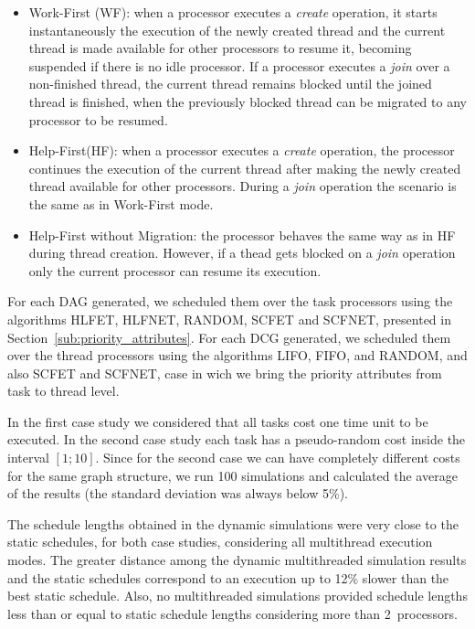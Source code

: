 \documentclass[twocolumn]{svjour3}
\begin{document}
\begin{itemize}
\item Work-First (WF): when a processor executes a \emph{create} operation, it starts instantaneously the execution of the newly created thread and the current thread is made available for other processors to resume it, becoming suspended if there is no idle processor. If a processor executes a \emph{join} over a non-finished thread, the current thread remains blocked until the joined thread is finished, when the previously blocked thread can be migrated to any processor to be resumed.
\item Help-First(HF): when a processor executes a \emph{create} operation, the processor continues the execution of the current thread after making the newly created thread available for other processors. During a \emph{join} operation the scenario is the same as in Work-First mode.
\item Help-First without Migration: the processor behaves the same way as in HF during thread creation. However, if a thead gets blocked on a \emph{join} operation only the current processor can resume its execution.
\end{itemize}

For each DAG generated, we scheduled them over the task processors using the algorithms HLFET, HLFNET, RANDOM, SCFET and SCFNET, presented in Section~\ref{sub:priority_attributes}. For each DCG generated, we scheduled them over the thread processors using the algorithms LIFO, FIFO, and RANDOM, and also SCFET and SCFNET, case in wich we bring the priority attributes from task to thread level.

In the first case study we considered that all tasks cost one time unit to be executed. In the second case study each task has a pseudo-random cost inside the interval $[1;10]$. Since for the second case we can have completely different costs for the same graph structure, we run 100 simulations and calculated the average of the results (the standard deviation was always below 5\%).

The schedule lengths obtained in the dynamic simulations were very close to the static schedules, for both case studies, considering all multithread execution modes. The greater distance among the dynamic multithreaded simulation results and the static schedules correspond to an execution up to 12\% slower than the best static schedule. Also, no multithreaded simulations provided schedule lengths less than or equal to static schedule lengths considering more than 2~processors.
\end{document}

